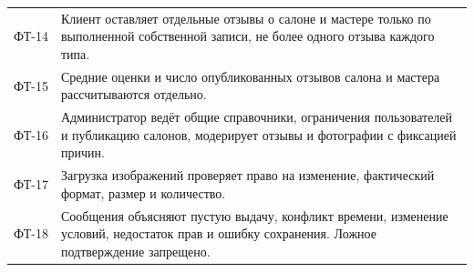 \begin{longtable}{L{1.6cm}L{13.2cm}}
ФТ-14 & Клиент оставляет отдельные отзывы о салоне и мастере только по выполненной собственной записи, не более одного отзыва каждого типа. \\
ФТ-15 & Средние оценки и число опубликованных отзывов салона и мастера рассчитываются отдельно. \\
ФТ-16 & Администратор ведёт общие справочники, ограничения пользователей и публикацию салонов, модерирует отзывы и фотографии с фиксацией причин. \\
ФТ-17 & Загрузка изображений проверяет право на изменение, фактический формат, размер и количество. \\
ФТ-18 & Сообщения объясняют пустую выдачу, конфликт времени, изменение условий, недостаток прав и ошибку сохранения. Ложное подтверждение запрещено. \\
\bottomrule
\end{longtable}

